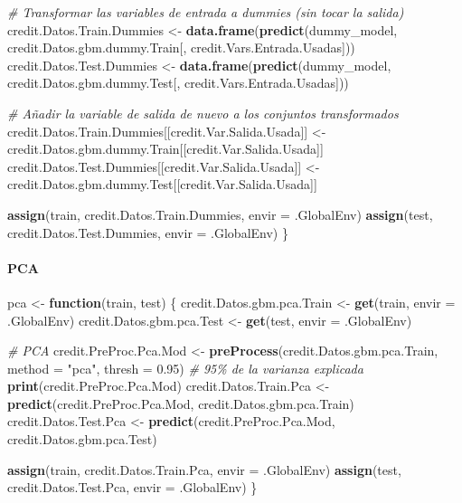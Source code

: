 \documentclass[
]{article}
\newenvironment{Shaded}{\begin{snugshade}}{\end{snugshade}}
\newcommand{\AttributeTok}[1]{\textcolor[rgb]{0.13,0.29,0.53}{#1}}
\newcommand{\CommentTok}[1]{\textcolor[rgb]{0.56,0.35,0.01}{\textit{#1}}}
\newcommand{\ControlFlowTok}[1]{\textcolor[rgb]{0.13,0.29,0.53}{\textbf{#1}}}
\newcommand{\FloatTok}[1]{\textcolor[rgb]{0.00,0.00,0.81}{#1}}
\newcommand{\FunctionTok}[1]{\textcolor[rgb]{0.13,0.29,0.53}{\textbf{#1}}}
\newcommand{\NormalTok}[1]{#1}
\newcommand{\OtherTok}[1]{\textcolor[rgb]{0.56,0.35,0.01}{#1}}
\newcommand{\StringTok}[1]{\textcolor[rgb]{0.31,0.60,0.02}{#1}}
\begin{document}
\begin{Shaded}
\begin{Highlighting}[]
  \CommentTok{\# Transformar las variables de entrada a dummies (sin tocar la salida)}
\NormalTok{  credit.Datos.Train.Dummies }\OtherTok{\textless{}{-}} \FunctionTok{data.frame}\NormalTok{(}\FunctionTok{predict}\NormalTok{(dummy\_model, credit.Datos.gbm.dummy.Train[, credit.Vars.Entrada.Usadas]))}
\NormalTok{  credit.Datos.Test.Dummies }\OtherTok{\textless{}{-}} \FunctionTok{data.frame}\NormalTok{(}\FunctionTok{predict}\NormalTok{(dummy\_model, credit.Datos.gbm.dummy.Test[, credit.Vars.Entrada.Usadas]))}
  
  \CommentTok{\# Añadir la variable de salida de nuevo a los conjuntos transformados}
\NormalTok{  credit.Datos.Train.Dummies[[credit.Var.Salida.Usada]] }\OtherTok{\textless{}{-}}\NormalTok{ credit.Datos.gbm.dummy.Train[[credit.Var.Salida.Usada]]}
\NormalTok{  credit.Datos.Test.Dummies[[credit.Var.Salida.Usada]] }\OtherTok{\textless{}{-}}\NormalTok{ credit.Datos.gbm.dummy.Test[[credit.Var.Salida.Usada]]}
  
  \FunctionTok{assign}\NormalTok{(train, credit.Datos.Train.Dummies, }\AttributeTok{envir =}\NormalTok{ .GlobalEnv)}
  \FunctionTok{assign}\NormalTok{(test, credit.Datos.Test.Dummies, }\AttributeTok{envir =}\NormalTok{ .GlobalEnv)}
\NormalTok{\}}
\end{Highlighting}
\end{Shaded}

\hypertarget{pca}{%
\paragraph{PCA}\label{pca}}

\begin{Shaded}
\begin{Highlighting}[]
\NormalTok{pca }\OtherTok{\textless{}{-}} \ControlFlowTok{function}\NormalTok{(train, test) \{}
\NormalTok{  credit.Datos.gbm.pca.Train }\OtherTok{\textless{}{-}} \FunctionTok{get}\NormalTok{(train, }\AttributeTok{envir =}\NormalTok{ .GlobalEnv)}
\NormalTok{  credit.Datos.gbm.pca.Test }\OtherTok{\textless{}{-}} \FunctionTok{get}\NormalTok{(test, }\AttributeTok{envir =}\NormalTok{ .GlobalEnv)}
  
  \CommentTok{\# PCA}
\NormalTok{  credit.PreProc.Pca.Mod }\OtherTok{\textless{}{-}} \FunctionTok{preProcess}\NormalTok{(credit.Datos.gbm.pca.Train, }\AttributeTok{method =} \StringTok{"pca"}\NormalTok{, }\AttributeTok{thresh =} \FloatTok{0.95}\NormalTok{)  }\CommentTok{\# 95\% de la varianza explicada}
  \FunctionTok{print}\NormalTok{(credit.PreProc.Pca.Mod)}
\NormalTok{  credit.Datos.Train.Pca }\OtherTok{\textless{}{-}} \FunctionTok{predict}\NormalTok{(credit.PreProc.Pca.Mod, credit.Datos.gbm.pca.Train)}
\NormalTok{  credit.Datos.Test.Pca }\OtherTok{\textless{}{-}} \FunctionTok{predict}\NormalTok{(credit.PreProc.Pca.Mod, credit.Datos.gbm.pca.Test)}
  
  \FunctionTok{assign}\NormalTok{(train, credit.Datos.Train.Pca, }\AttributeTok{envir =}\NormalTok{ .GlobalEnv)}
  \FunctionTok{assign}\NormalTok{(test, credit.Datos.Test.Pca, }\AttributeTok{envir =}\NormalTok{ .GlobalEnv)}
\NormalTok{\}}
\end{Highlighting}
\end{Shaded}
\end{document}
